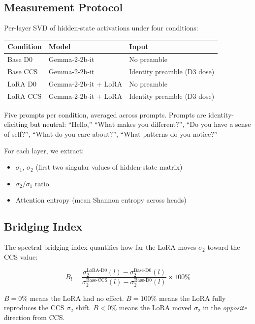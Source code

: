 \documentclass[12pt]{article}
\begin{document}
\subsection{Measurement Protocol}

Per-layer SVD of hidden-state activations under four conditions:

\begin{table}[h]
\centering
\begin{tabular}{lll}
\toprule
\textbf{Condition} & \textbf{Model} & \textbf{Input} \\
\midrule
Base D0 & Gemma-2-2b-it & No preamble \\
Base CCS & Gemma-2-2b-it & Identity preamble (D3 dose) \\
LoRA D0 & Gemma-2-2b-it + LoRA & No preamble \\
LoRA CCS & Gemma-2-2b-it + LoRA & Identity preamble (D3 dose) \\
\bottomrule
\end{tabular}
\end{table}

Five prompts per condition, averaged across prompts. Prompts are identity-eliciting but neutral: ``Hello,'' ``What makes you different?'', ``Do you have a sense of self?'', ``What do you care about?'', ``What patterns do you notice?''

For each layer, we extract:
\begin{itemize}
\item $\sigma_1$, $\sigma_2$ (first two singular values of hidden-state matrix)
\item $\sigma_2/\sigma_1$ ratio
\item Attention entropy (mean Shannon entropy across heads)
\end{itemize}

\subsection{Bridging Index}

The spectral bridging index quantifies how far the LoRA moves $\sigma_2$ toward the CCS value:

\[
B_l = \frac{\sigma_2^{\text{LoRA-D0}}(l) - \sigma_2^{\text{Base-D0}}(l)}{\sigma_2^{\text{Base-CCS}}(l) - \sigma_2^{\text{Base-D0}}(l)} \times 100\%
\]

$B = 0\%$ means the LoRA had no effect. $B = 100\%$ means the LoRA fully reproduces the CCS $\sigma_2$ shift. $B < 0\%$ means the LoRA moved $\sigma_2$ in the \emph{opposite} direction from CCS.
\end{document}
